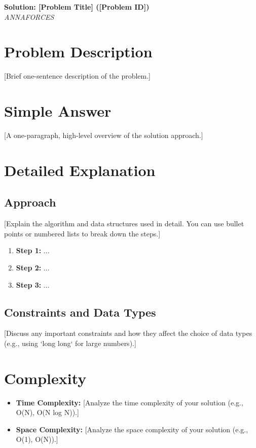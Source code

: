\documentclass[11pt,a4paper]{article}
\begin{document}
\begin{center}
  {\LARGE \bf Solution: [Problem Title] ([Problem ID])}\\[6pt]
  {\large \it ANNAFORCES}\
  \vspace{6pt}
\end{center}

\section*{Problem Description}
[Brief one-sentence description of the problem.]

\section*{Simple Answer}
[A one-paragraph, high-level overview of the solution approach.]

\section*{Detailed Explanation}
\subsection*{Approach}
[Explain the algorithm and data structures used in detail. You can use bullet points or numbered lists to break down the steps.]
\begin{enumerate}[leftmargin=*]
  \item \textbf{Step 1:} ...
  \item \textbf{Step 2:} ...
  \item \textbf{Step 3:} ...
\end{enumerate}

\subsection*{Constraints and Data Types}
[Discuss any important constraints and how they affect the choice of data types (e.g., using `long long` for large numbers).]

\section*{Complexity}
\begin{itemize}[leftmargin=*]
  \item \textbf{Time Complexity:} [Analyze the time complexity of your solution (e.g., O(N), O(N log N)).]
  \item \textbf{Space Complexity:} [Analyze the space complexity of your solution (e.g., O(1), O(N)).]
\end{itemize}
\end{document}
